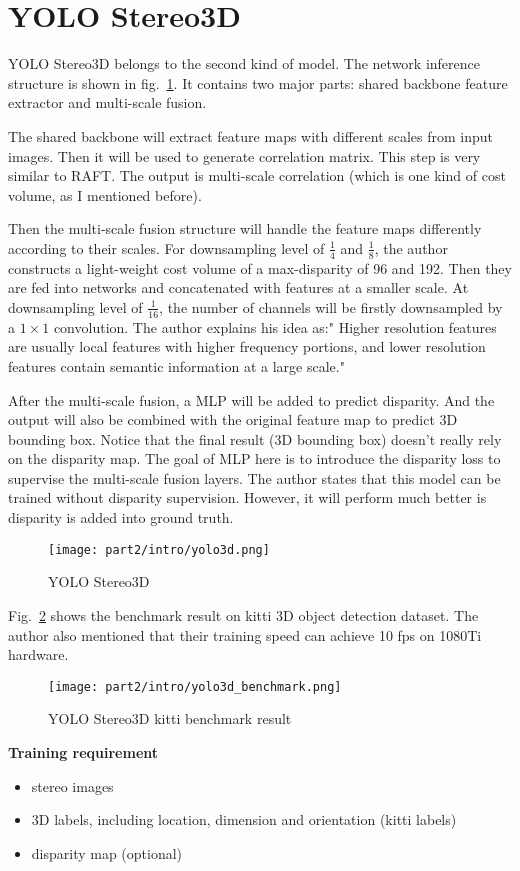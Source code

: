 \documentclass[12pt]{article}
\begin{document}
\section{YOLO Stereo3D\cite{yolo3d}}
YOLO Stereo3D belongs to the second kind of model. The network inference structure is shown in fig.~\ref{yolo3d}. It contains two major parts: shared backbone feature extractor and multi-scale fusion. 

The shared backbone will extract feature maps with different scales from input images. Then it will be used to generate correlation matrix. This step is very similar to RAFT. The output is multi-scale correlation (which is one kind of cost volume, as I mentioned before). 

Then the multi-scale fusion structure will handle the feature maps differently according to their scales. For downsampling level of $\frac{1}{4}$ and $\frac{1}{8}$, the author constructs a light-weight cost volume of a max-disparity of 96 and 192. Then they are fed into networks and concatenated with features at a smaller scale. At downsampling level of $\frac{1}{16}$, the number of channels will be firstly downsampled by a $1\times 1$ convolution. The author explains his idea as:" Higher resolution features are usually local features with higher frequency portions, and lower resolution features contain semantic information at a large scale."

After the multi-scale fusion, a MLP will be added to predict disparity. And the output will also be combined with the original feature map to predict 3D bounding box. Notice that the final result (3D bounding box) doesn't really rely on the disparity map. The goal of MLP here is to introduce the disparity loss to supervise the multi-scale fusion layers. The author states that this model can be trained without disparity supervision. However, it will perform much better is disparity is added into ground truth.
\begin{figure}[H]
    \centering
    \texttt{[image: part2/intro/yolo3d.png]}
    \caption{YOLO Stereo3D}
    \label{yolo3d}
\end{figure}
Fig.~\ref{yolo3d_benchmark} shows the benchmark result on kitti 3D object detection dataset. The author also mentioned that their training speed can achieve 10 fps on 1080Ti hardware.
\begin{figure}[H]
    \centering
    \texttt{[image: part2/intro/yolo3d\_benchmark.png]}
    \caption{YOLO Stereo3D kitti benchmark result}
    \label{yolo3d_benchmark}
\end{figure}
\textbf{Training requirement}
\begin{itemize}
    \item stereo images
    \item 3D labels, including location, dimension and orientation (kitti labels)
    \item disparity map (optional)
\end{itemize}
\end{document}
